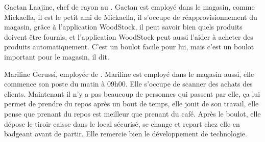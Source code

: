 Gaetan Laajine, chef de rayon au \fm.\crlf
Gaetan est employé dans le magasin, comme Mickaella, il est le petit ami de Mickaella, il s'occupe de réapprovisionnement du magasin, grâce à l'application WoodStock, il peut savoir bien quels produits doivent être fournis, et l'application WoodStock peut aussi l'aider à acheter des produits automatiquement. 
C'est un boulot facile pour lui, mais c'est un boulot important pour le magasin, il dit.
\stopfiguretext

Mariline Gerussi, employée de \fm.\crlf
Mariline est employé dans le magasin aussi, elle commence son poste du matin à 09h00. 
Elle s'occupe de scanner des achats des clients. 
Maintenant il n'y a pas beaucoup de personnes qui passent par elle, ça lui permet de prendre du repos après un bout de temps, elle jouit de son travail, elle pense que prenant du repos est meilleur que prenant du café. 
Après le boulot, elle dépose le tiroir caisse dans le local sécurisé, se change et repart chez elle en badgeant avant de partir. 
Elle remercie bien le développement de technologie.
\stopfiguretext
